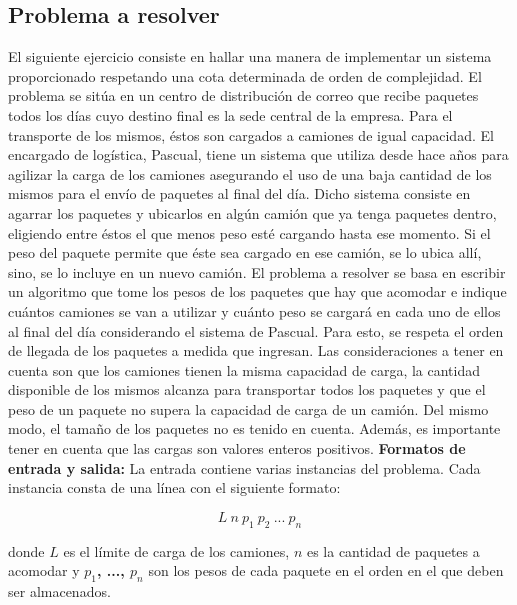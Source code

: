 \subsection{Problema a resolver}
El siguiente ejercicio consiste en hallar una manera de implementar un sistema proporcionado respetando una cota determinada de orden de complejidad. El problema se sitúa en un centro de distribución de correo que recibe paquetes todos los días cuyo destino final es la sede central de la empresa. Para el transporte de los mismos, éstos son cargados a camiones de igual capacidad. El encargado de logística, Pascual, tiene un sistema que utiliza desde hace años para agilizar la carga de los camiones asegurando el uso de una baja cantidad de los mismos para el envío de paquetes al final del día. Dicho sistema consiste en agarrar los paquetes y ubicarlos en algún camión que ya tenga paquetes dentro, eligiendo entre éstos el que menos peso esté cargando hasta ese momento. Si el peso del paquete permite que éste sea cargado en ese camión, se lo ubica allí, sino, se lo incluye en un nuevo camión.\newline
El problema a resolver se basa en escribir un algoritmo que tome los pesos de los paquetes que hay que acomodar e indique cuántos camiones se van a utilizar y cuánto peso se cargará en cada uno de ellos al final del día considerando el sistema de Pascual. Para esto, se respeta el orden de llegada de los paquetes a medida que ingresan. \newline
Las consideraciones a tener en cuenta son que los camiones tienen la misma capacidad de carga, la cantidad disponible de los mismos alcanza para transportar todos los paquetes y que el peso de un paquete no supera la capacidad de carga de un camión. Del mismo modo, el tamaño de los paquetes no es tenido en cuenta. Además, es importante tener en cuenta que las cargas son valores enteros positivos.\newline
\newline
\textbf {{Formatos de entrada y salida:}}\newline
\newline
La entrada contiene varias instancias del problema. Cada instancia consta de una línea con el siguiente formato:

$$L\ n\ p_{1}\ p_{2}\ ...\ p_{n}$$


donde \textbf{$L$} es el límite de carga de los camiones, \textbf{$n$} es la cantidad de paquetes a acomodar y \textbf{$p_{1}$, ..., $p_{n}$} son los pesos de cada paquete en el orden en el que deben ser almacenados.\newline

